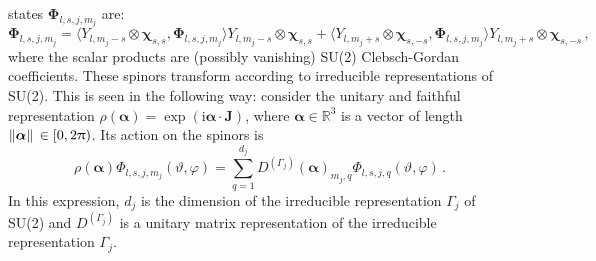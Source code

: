 \documentclass[fontsize=12pt,
               twoside=false,
               BCOR=0mm,
               DIV=14,
               overfullrule=false, %
               toc=bibliography,
               headinclude=true,
               footinclude=false]{scrartcl}
\numberwithin{equation}{section}
\newcommand{\ii}{\mathrm{i}}
\newcommand{\pii}{\uppi}
\begin{document}
    states $\bm{\Phi}_{l,s,j,m_j}$ are:
    \begin{equation}\label{eq:CoupledBasis}
        \bm{\Phi}_{l,s,j,m_j}
        =
        \langle Y_{l,m_j-s}\otimes\bm{\chi}_{s,s},\bm{\Phi}_{l,s,j,m_j} \rangle
        Y_{l,m_j-s}\otimes\bm{\chi}_{s,s}
        +
        \langle Y_{l,m_j+s}\otimes\bm{\chi}_{s,-s},\bm{\Phi}_{l,s,j,m_j} \rangle
        Y_{l,m_j+s}\otimes\bm{\chi}_{s,-s}
    \,,
    \end{equation}
    where the scalar products are (possibly vanishing) SU(2) Clebsch-Gordan
    coefficients. These spinors transform according to irreducible
    representations of SU(2). This is seen in the following way: consider the
    unitary and faithful representation
    $\rho(\bm{\alpha})=\exp(\ii\bm{\alpha}\cdot\bm{J})$, where
    $\bm{\alpha}\in\mathbb{R}^3$ is a vector of length
    $\norm*{\bm{\alpha}}\in[0,2\pii)$. Its action on the spinors is
    \begin{equation}
        \rho(\bm{\alpha})
        \Phi_{l,s,j,m_j}(\vartheta,\varphi)
        =
        \sum^{d_j}_{q=1} D^{(\Gamma_j)}(\bm{\alpha})_{m_j,q}
        \Phi_{l,s,j,q}(\vartheta,\varphi)
    \,.
    \end{equation}
    In this expression, $d_j$ is the dimension of the irreducible representation
    $\Gamma_j$ of SU(2) and $D^{(\Gamma_j)}$ is a unitary matrix representation
    of the irreducible representation $\Gamma_j$.
\end{document}

